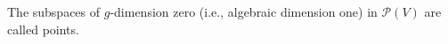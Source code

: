The subspaces of $g$-dimension zero (i.e., algebraic dimension one) in $\mathcal{P}(V)$ are called points.
